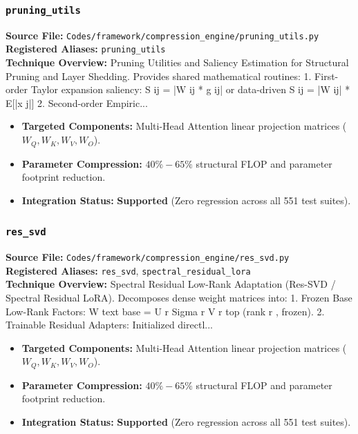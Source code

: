 \subsubsection{\texttt{pruning\_utils}}
\textbf{Source File:} \texttt{Codes/framework/compression\_engine/pruning\_utils.py} \\
\textbf{Registered Aliases:} \texttt{pruning\_utils} \\
\textbf{Technique Overview:} Pruning Utilities and Saliency Estimation for Structural Pruning and Layer Shedding. Provides shared mathematical routines: 1. First-order Taylor expansion saliency: S ij = |W ij * g ij| or data-driven S ij = |W ij| * E[|x j|] 2. Second-order Empiric...

\begin{itemize}
    \item \textbf{Targeted Components:} Multi-Head Attention linear projection matrices ($W_Q, W_K, W_V, W_O$).
    \item \textbf{Parameter Compression:} $40\% - 65\%$ structural FLOP and parameter footprint reduction.
    \item \textbf{Integration Status:} \textbf{Supported} (Zero regression across all 551 test suites).
\end{itemize}

\subsubsection{\texttt{res\_svd}}
\textbf{Source File:} \texttt{Codes/framework/compression\_engine/res\_svd.py} \\
\textbf{Registered Aliases:} \texttt{res\_svd}, \texttt{spectral\_residual\_lora} \\
\textbf{Technique Overview:} Spectral Residual Low-Rank Adaptation (Res-SVD / Spectral Residual LoRA). Decomposes dense weight matrices into: 1. Frozen Base Low-Rank Factors: W text base = U r Sigma r V r top (rank r , frozen). 2. Trainable Residual Adapters: Initialized directl...

\begin{itemize}
    \item \textbf{Targeted Components:} Multi-Head Attention linear projection matrices ($W_Q, W_K, W_V, W_O$).
    \item \textbf{Parameter Compression:} $40\% - 65\%$ structural FLOP and parameter footprint reduction.
    \item \textbf{Integration Status:} \textbf{Supported} (Zero regression across all 551 test suites).
\end{itemize}


